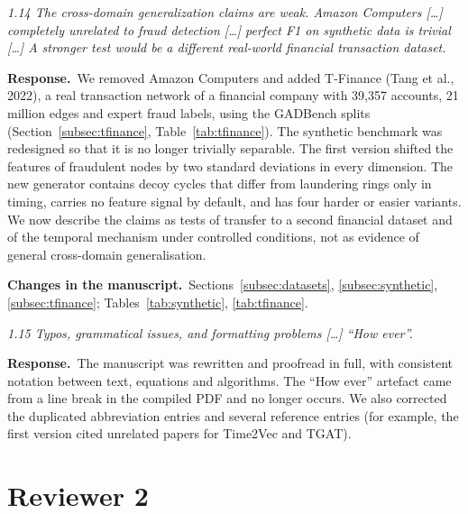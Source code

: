 \documentclass[11pt]{article}
\newenvironment{comment}{\par\medskip\noindent\begin{minipage}{\linewidth}\itshape\color{black!75}}{\end{minipage}\par\smallskip}
\newcommand{\resp}{\par\noindent\textbf{Response.}\ }
\newcommand{\change}{\par\noindent\textbf{Changes in the manuscript.}\ }
\begin{document}
\begin{comment}
1.14 The cross-domain generalization claims are weak. Amazon Computers [\dots] completely unrelated to fraud detection [\dots] perfect F1 on synthetic data is trivial [\dots] A stronger test would be a different real-world financial transaction dataset.
\end{comment}
\resp We removed Amazon Computers and added T-Finance (Tang et al., 2022), a real transaction network of a financial company with 39,357 accounts, 21 million edges and expert fraud labels, using the GADBench splits (Section~\ref{subsec:tfinance}, Table~\ref{tab:tfinance}). The synthetic benchmark was redesigned so that it is no longer trivially separable. The first version shifted the features of fraudulent nodes by two standard deviations in every dimension. The new generator contains decoy cycles that differ from laundering rings only in timing, carries no feature signal by default, and has four harder or easier variants. We now describe the claims as tests of transfer to a second financial dataset and of the temporal mechanism under controlled conditions, not as evidence of general cross-domain generalisation.
\change Sections~\ref{subsec:datasets}, \ref{subsec:synthetic}, \ref{subsec:tfinance}; Tables~\ref{tab:synthetic}, \ref{tab:tfinance}.

\begin{comment}
1.15 Typos, grammatical issues, and formatting problems [\dots] ``How ever''.
\end{comment}
\resp The manuscript was rewritten and proofread in full, with consistent notation between text, equations and algorithms. The ``How ever'' artefact came from a line break in the compiled PDF and no longer occurs. We also corrected the duplicated abbreviation entries and several reference entries (for example, the first version cited unrelated papers for Time2Vec and TGAT).

\section*{Reviewer 2}
\end{document}
